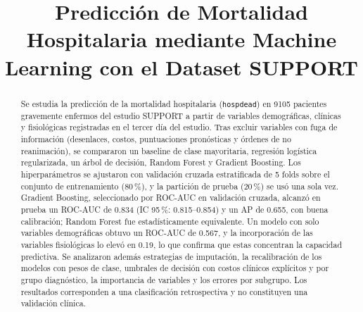 \documentclass[conference]{IEEEtran}
\begin{document}
\title{Predicción de Mortalidad Hospitalaria mediante Machine Learning con el Dataset SUPPORT}

\author{
\and

\and

}

\maketitle

\begin{abstract}
Se estudia la predicción de la mortalidad hospitalaria (\texttt{hospdead}) en 9105 pacientes gravemente enfermos del estudio SUPPORT a partir de variables demográficas, clínicas y fisiológicas registradas en el tercer día del estudio. Tras excluir variables con fuga de información (desenlaces, costos, puntuaciones pronósticas y órdenes de no reanimación), se compararon un baseline de clase mayoritaria, regresión logística regularizada, un árbol de decisión, Random Forest y Gradient Boosting. Los hiperparámetros se ajustaron con validación cruzada estratificada de 5 folds sobre el conjunto de entrenamiento (80\,\%), y la partición de prueba (20\,\%) se usó una sola vez. Gradient Boosting, seleccionado por ROC-AUC en validación cruzada, alcanzó en prueba un ROC-AUC de 0.834 (IC 95\,\%: 0.815--0.854) y un AP de 0.655, con buena calibración; Random Forest fue estadísticamente equivalente. Un modelo con solo variables demográficas obtuvo un ROC-AUC de 0.567, y la incorporación de las variables fisiológicas lo elevó en 0.19, lo que confirma que estas concentran la capacidad predictiva. Se analizaron además estrategias de imputación, la recalibración de los modelos con pesos de clase, umbrales de decisión con costos clínicos explícitos y por grupo diagnóstico, la importancia de variables y los errores por subgrupo. Los resultados corresponden a una clasificación retrospectiva y no constituyen una validación clínica.
\end{abstract}
\end{document}
